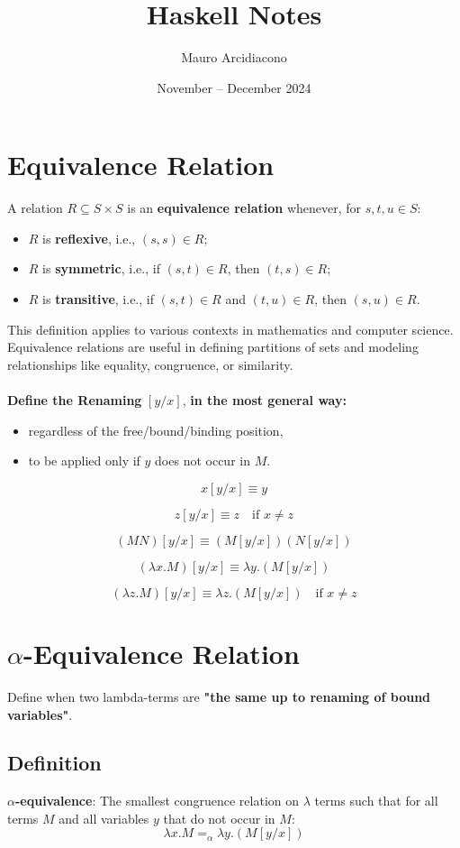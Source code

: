 \documentclass{article}
\title{\textbf{Haskell Notes}}
\author{Mauro Arcidiacono}
\date{November -- December 2024}
\begin{document}
\maketitle

\section*{Equivalence Relation}

A relation $R \subseteq S \times S$ is an \textbf{equivalence relation} whenever, for $s, t, u \in S$:
\begin{itemize}
    \item $R$ is \textbf{reflexive}, i.e., $(s, s) \in R$;
    \item $R$ is \textbf{symmetric}, i.e., if $(s, t) \in R$, then $(t, s) \in R$;
    \item $R$ is \textbf{transitive}, i.e., if $(s, t) \in R$ and $(t, u) \in R$, then $(s, u) \in R$.
\end{itemize}

This definition applies to various contexts in mathematics and computer science. Equivalence relations are useful in defining partitions of sets and modeling relationships like equality, congruence, or similarity.
\\
\\
\textbf{Define the Renaming} $[y/x]$, \textbf{in the most general way:}
\begin{itemize}
    \item regardless of the free/bound/binding position,
    \item to be applied only if $y$ does not occur in $M$.
\end{itemize}

\[
x[y/x] \equiv y
\]

\[
z[y/x] \equiv z \quad \text{if } x \neq z
\]

\[
(MN)[y/x] \equiv (M[y/x])(N[y/x])
\]

\[
(\lambda x.M)[y/x] \equiv \lambda y.(M[y/x])
\]

\[
(\lambda z.M)[y/x] \equiv \lambda z.(M[y/x]) \quad \text{if } x \neq z
\]
\section*{$\alpha$-Equivalence Relation}

Define when two lambda-terms are \textbf{"the same up to renaming of bound variables"}.

\subsection*{Definition}
\textbf{$\alpha$-equivalence}: The smallest congruence relation on $\lambda$ terms such that for all terms $M$ and all variables $y$ that do not occur in $M$:
\[
\lambda x.M =_\alpha \lambda y.(M[y/x])
\]
\end{document}
